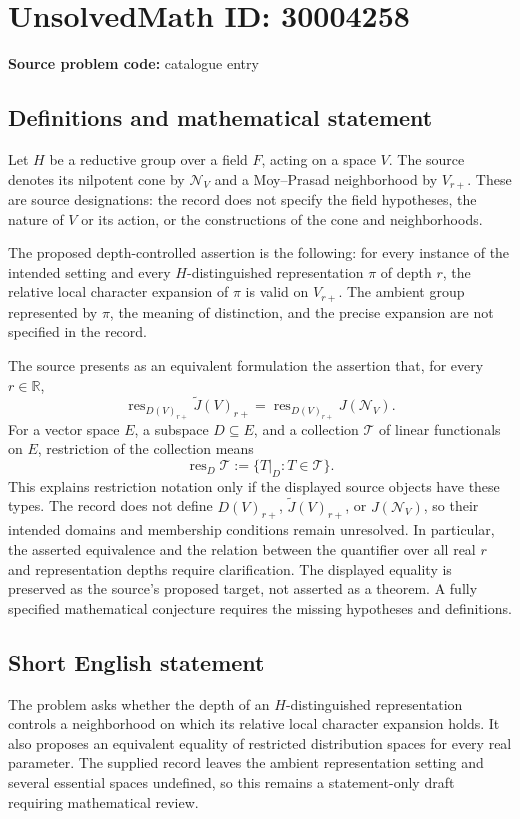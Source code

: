 \documentclass[11pt]{article}
\newcommand{\R}{\mathbb{R}}
\begin{document}
\section*{UnsolvedMath ID: 30004258}
\textbf{Source problem code:} catalogue entry
\subsection{Definitions and mathematical statement}
Let \(H\) be a reductive group over a field \(F\), acting on a space \(V\). The source denotes its nilpotent cone by \(\mathcal N_V\) and a Moy--Prasad neighborhood by \(V_{r+}\). These are source designations: the record does not specify the field hypotheses, the nature of \(V\) or its action, or the constructions of the cone and neighborhoods.

The proposed depth-controlled assertion is the following: for every instance of the intended setting and every \(H\)-distinguished representation \(\pi\) of depth \(r\), the relative local character expansion of \(\pi\) is valid on \(V_{r+}\). The ambient group represented by \(\pi\), the meaning of distinction, and the precise expansion are not specified in the record.

The source presents as an equivalent formulation the assertion that, for every \(r\in\R\),
\[
\operatorname{res}_{D(V)_{r+}}\widetilde J(V)_{r+}
=
\operatorname{res}_{D(V)_{r+}}J(\mathcal N_V).
\]
For a vector space \(E\), a subspace \(D\subseteq E\), and a collection \(\mathcal T\) of linear functionals on \(E\), restriction of the collection means
\[
\operatorname{res}_{D}\mathcal T
:=\{T|_D:T\in\mathcal T\}.
\]
This explains restriction notation only if the displayed source objects have these types. The record does not define \(D(V)_{r+}\), \(\widetilde J(V)_{r+}\), or \(J(\mathcal N_V)\), so their intended domains and membership conditions remain unresolved. In particular, the asserted equivalence and the relation between the quantifier over all real \(r\) and representation depths require clarification. The displayed equality is preserved as the source's proposed target, not asserted as a theorem. A fully specified mathematical conjecture requires the missing hypotheses and definitions.
\subsection{Short English statement}
The problem asks whether the depth of an \(H\)-distinguished representation controls a neighborhood on which its relative local character expansion holds. It also proposes an equivalent equality of restricted distribution spaces for every real parameter. The supplied record leaves the ambient representation setting and several essential spaces undefined, so this remains a statement-only draft requiring mathematical review.
\end{document}
